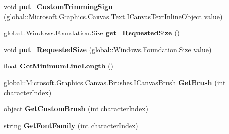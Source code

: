 \begin{DoxyCompactItemize}
\mbox{\label{interface_microsoft_1_1_graphics_1_1_canvas_1_1_text_1_1_i_canvas_text_layout_ad0963a1a76ce3a3b271681e1b918507a}} 
void {\bfseries put\+\_\+\+Custom\+Trimming\+Sign} (global\+::\+Microsoft.\+Graphics.\+Canvas.\+Text.\+I\+Canvas\+Text\+Inline\+Object value)
\item 
\mbox{\label{interface_microsoft_1_1_graphics_1_1_canvas_1_1_text_1_1_i_canvas_text_layout_a1841b5e910690e9cee09e1ac213a8ac1}} 
global\+::\+Windows.\+Foundation.\+Size {\bfseries get\+\_\+\+Requested\+Size} ()
\item 
\mbox{\label{interface_microsoft_1_1_graphics_1_1_canvas_1_1_text_1_1_i_canvas_text_layout_ab9dab05e946a16f3890a64994cacbefa}} 
void {\bfseries put\+\_\+\+Requested\+Size} (global\+::\+Windows.\+Foundation.\+Size value)
\item 
\mbox{\label{interface_microsoft_1_1_graphics_1_1_canvas_1_1_text_1_1_i_canvas_text_layout_ab72d6c0b05ffd6c77a1ea9209068762f}} 
float {\bfseries Get\+Minimum\+Line\+Length} ()
\item 
\mbox{\label{interface_microsoft_1_1_graphics_1_1_canvas_1_1_text_1_1_i_canvas_text_layout_ad050d500e747c564fb32606eae5ef1dd}} 
global\+::\+Microsoft.\+Graphics.\+Canvas.\+Brushes.\+I\+Canvas\+Brush {\bfseries Get\+Brush} (int character\+Index)
\item 
\mbox{\label{interface_microsoft_1_1_graphics_1_1_canvas_1_1_text_1_1_i_canvas_text_layout_a7a95a3c170985bc5b49dca2fa202e6f0}} 
object {\bfseries Get\+Custom\+Brush} (int character\+Index)
\item 
\mbox{\label{interface_microsoft_1_1_graphics_1_1_canvas_1_1_text_1_1_i_canvas_text_layout_ae740709ccfaa0a5c4435926659d785bd}} 
string {\bfseries Get\+Font\+Family} (int character\+Index)

\end{DoxyCompactItemize}
